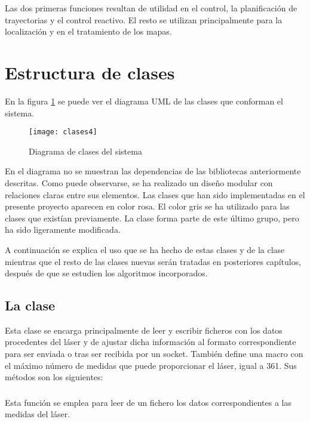 Las dos primeras funciones resultan de utilidad en el control, la planificación de trayectorias y el control reactivo. El resto se utilizan principalmente para la localización y en el tratamiento de los mapas.

\section{ Estructura de clases}
En la figura \ref{fg:uml} se puede ver el diagrama UML de las clases que conforman el sistema.

\begin{figure}[tbp]
  \centering\texttt{[image: clases4]}\\
  \caption{Diagrama de clases del sistema}\label{fg:uml}
\end{figure}

En el diagrama no se muestran las dependencias de las bibliotecas anteriormente descritas. Como puede observarse, se ha realizado un diseño modular con relaciones claras entre sus elementos. Las clases que han sido implementadas en el presente proyecto aparecen en color rosa. El color gris se ha utilizado para las clases que existían previamente. La clase  forma parte de este último grupo, pero ha sido ligeramente modificada.

A continuación se explica el uso que se ha hecho de estas clases y de la clase  mientras que el resto de las clases nuevas serán tratadas en posteriores capítulos, después de que se estudien los algoritmos incorporados.

\subsection{La clase }
Esta clase se encarga principalmente de leer y escribir ficheros con los datos procedentes del láser y de ajustar dicha información al formato correspondiente para ser enviada o tras ser recibida por un socket. También define una macro con el máximo número de medidas que puede proporcionar el láser, igual a 361.
Sus métodos son los siguientes:

\subsubsection{}

\noindent
{}

\noindent
Esta función se emplea para leer de un fichero los datos correspondientes a las medidas del láser.


